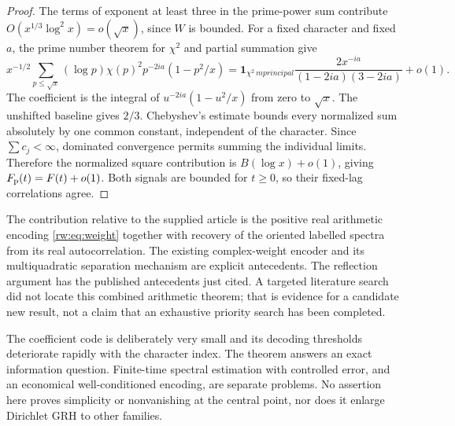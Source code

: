 \begin{proof}
The terms of exponent at least three in the prime-power sum contribute
$O(x^{1/3}\log^2x)=o(\sqrt x)$, since $W$ is bounded. For a fixed
character and fixed $a$, the prime number theorem for $\chi^2$ and
partial summation give
\[
 x^{-1/2}\sum_{p\le\sqrt x}(\log p)\chi(p)^2p^{-2ia}(1-p^2/x)
 =\mathbf1_{\chi^2\ {
m principal}}
 \frac{2x^{-ia}}{(1-2ia)(3-2ia)}+o(1).
\]
The coefficient is the integral of $u^{-2ia}(1-u^2/x)$ from zero to
$\sqrt x$. The unshifted baseline gives $2/3$. Chebyshev's estimate
bounds every normalized sum absolutely by one common constant,
independent of the character. Since $\sum c_j<\infty$, dominated
convergence permits summing the individual limits. Therefore the
normalized square contribution is $B(\log x)+o(1)$, giving
$F_{\rm p}(t)=F(t)+o(1)$. Both signals are bounded for $t\ge0$, so their
fixed-lag correlations agree.
\end{proof}

The contribution relative to the supplied article is the positive real
arithmetic encoding \eqref{rw:eq:weight} together with recovery of the
oriented labelled spectra from its real autocorrelation. The existing
complex-weight encoder and its multiquadratic separation mechanism are
explicit antecedents. The reflection argument has the published
antecedents just cited. A targeted literature search did not locate this
combined arithmetic theorem; that is evidence for a candidate new result,
not a claim that an exhaustive priority search has been completed.

The coefficient code is deliberately very small and its decoding
thresholds deteriorate rapidly with the character index. The theorem
answers an exact information question. Finite-time spectral estimation
with controlled error, and an economical well-conditioned encoding, are
separate problems. No assertion here proves simplicity or nonvanishing
at the central point, nor does it enlarge Dirichlet GRH to other families.
